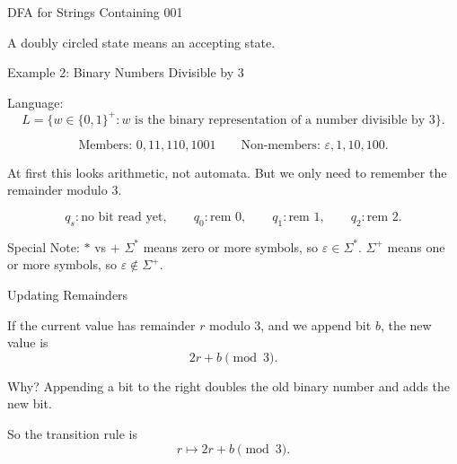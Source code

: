 \documentclass[10pt,aspectratio=169]{beamer}
\newcommand{\eps}{\varepsilon}
\begin{document}
\begin{frame}{DFA for Strings Containing 001}

\begin{center}
\end{center}

\vspace{0.5em}

A doubly circled state means an accepting state. 

\end{frame}

\begin{frame}{Example 2: Binary Numbers Divisible by 3}

Language:
\[
L=\{w\in\{0,1\}^+: w\text{ is the binary representation of a number divisible by }3\}.
\]

\[
\text{Members: }0,11,110,1001
\qquad
\text{Non-members: }\eps,1,10,100.
\]


At first this looks arithmetic, not automata. But we only need to remember the remainder modulo $3$.

\[
q_s: \text{no bit read yet},
\qquad
q_0: \text{rem }0,
\qquad
q_1: \text{rem }1,
\qquad
q_2: \text{rem }2.
\]

\begin{block}{Special Note: $*$ vs $+$}
$\Sigma^*$ means zero or more symbols, so $\eps\in\Sigma^*$.
$\Sigma^+$ means one or more symbols, so $\eps\notin\Sigma^+$.
\end{block}

\end{frame}

\begin{frame}{Updating Remainders}

If the current value has remainder $r$ modulo $3$, and we append bit $b$, the new value is
\[
2r+b \pmod 3.
\]

Why? Appending a bit to the right doubles the old binary number and adds the new bit.


So the transition rule is
\[
r\mapsto 2r+b \pmod 3.
\]

\end{frame}
\end{document}

